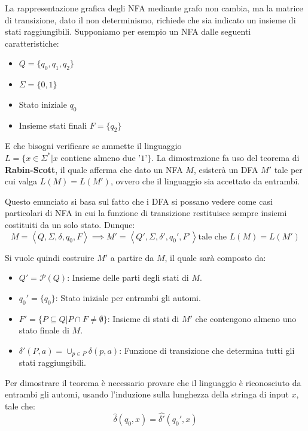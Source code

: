 \noindent La rappresentazione grafica degli NFA mediante grafo non cambia, ma la matrice di transizione, dato il non determinismo, richiede che sia
indicato un insieme di stati raggiungibili. Supponiamo per esempio un NFA dalle seguenti caratteristiche: \begin{itemize}
    \item $Q = \{q_0, q_1, q_2\}$
    \item $\Sigma = \{0, 1\}$
    \item Stato iniziale $q_0$
    \item Insieme stati finali $F = \{q_2\}$
\end{itemize}

\noindent E che bisogni verificare se ammette il linguaggio $L = \{x\in \Sigma^* | x \text{ contiene almeno due '1'}\}$. La dimostrazione fa uso del
teorema di \textbf{Rabin-Scott}, il quale afferma che dato un NFA $M$, esisterà un DFA $M'$ tale per cui valga $L(M) = L(M')$, ovvero che il linguaggio
sia accettato da entrambi.\par
Questo enunciato si basa sul fatto che i DFA si possano vedere come casi particolari di NFA in cui la funzione di transizione restituisce sempre insiemi
costituiti da un solo stato. Dunque: \[
	M = \left<Q, \Sigma, \delta, q_0, F \right> \implies M' = \left< Q', \Sigma, \delta', q_0', F'\right> \text{tale che } L(M) = L(M')
\]

\noindent Si vuole quindi costruire $M'$ a partire da $M$, il quale sarà composto da: \begin{itemize}
	\item $Q' = \mathcal{P}(Q)$: Insieme delle parti degli stati di $M$.
	\item $q_0' = \{q_0\}$: Stato iniziale per entrambi gli automi.
	\item $F' = \{P \subseteq Q | P\cap F \neq \emptyset\}$: Insieme di stati di $M'$ che contengono almeno uno stato finale di $M$.
	\item $\delta'(P,a) = \cup_{p\in P}\delta(p,a)$: Funzione di transizione che determina tutti gli stati raggiungibili.
\end{itemize}

\noindent Per dimostrare il teorema è necessario provare che il linguaggio è riconosciuto da entrambi gli automi, usando l'induzione sulla lunghezza
della stringa di input $x$, tale che: \[
	\hat{\delta}(q_0, x) = \hat{\delta'}(q_0', x)
\]

